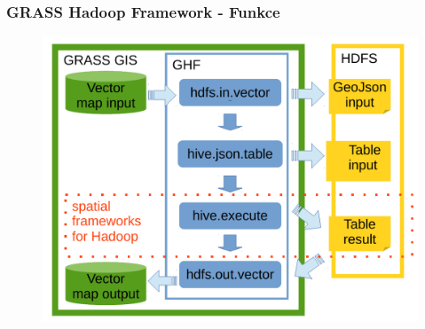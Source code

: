 \documentclass[unicode,bookmarksnumbered]{beamer}
\begin{document}
			
			

	\begin{frame}
		\frametitle{GRASS Hadoop Framework - Funkce}
		\begin{figure}
			\centering
			\includegraphics[width=1\textwidth]{./img/ghf/modules_schema.pdf}
		\end{figure}
	\end{frame}
\end{document}
